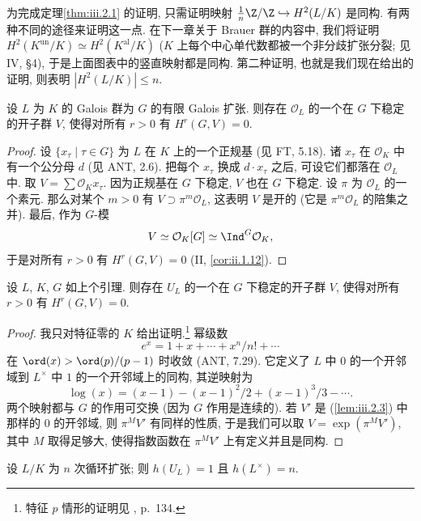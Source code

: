 为完成定理\ref{thm:iii.2.1} 的证明, 只需证明映射 $\tfrac{1}{n}\Z/\Z\hookrightarrow H^2(L/K)$ 是同构. 有两种不同的途径来证明这一点. 在下一章关于 Brauer 群的内容中, 我们将证明 $H^2(K^{\mathrm{un}}/K)\simeq H^2(K^{\mathrm{al}}/K)$ ($K$ 上每个中心单代数都被一个非分歧扩张分裂; 见 IV, \S 4), 于是上面图表中的竖直映射都是同构. 第二种证明, 也就是我们现在给出的证明, 则表明 $|H^2(L/K)|\le n$.

\begin{lemma}\label{lem:iii.2.3}
设 $L$ 为 $K$ 的 Galois 群为 $G$ 的有限 Galois 扩张. 则存在 $\mathcal{O}_L$ 的一个在 $G$ 下稳定的开子群 $V$, 使得对所有 $r>0$ 有 $H^r(G,V)=0$.
\end{lemma}

\begin{proof}
设 $\{x_\tau\mid\tau\in G\}$ 为 $L$ 在 $K$ 上的一个正规基 (见 FT, 5.18). 诸 $x_\tau$ 在 $\mathcal{O}_K$ 中有一个公分母 $d$ (见 ANT, 2.6). 把每个 $x_\tau$ 换成 $d\cdot x_\tau$ 之后, 可设它们都落在 $\mathcal{O}_L$ 中. 取 $V=\sum\mathcal{O}_K x_\tau$. 因为正规基在 $G$ 下稳定, $V$ 也在 $G$ 下稳定. 设 $\pi$ 为 $\mathcal{O}_L$ 的一个素元. 那么对某个 $m>0$ 有 $V\supset\pi^m\mathcal{O}_L$, 这表明 $V$ 是开的 (它是 $\pi^m\mathcal{O}_L$ 的陪集之并). 最后, 作为 $G$-模
\[
 V\simeq\mathcal{O}_K[G]\simeq\Ind^G\mathcal{O}_K,
\]
于是对所有 $r>0$ 有 $H^r(G,V)=0$ (II, \ref{cor:ii.1.12}).
\end{proof}

\begin{lemma}\label{lem:iii.2.4}
设 $L$, $K$, $G$ 如上个引理. 则存在 $U_L$ 的一个在 $G$ 下稳定的开子群 $V$, 使得对所有 $r>0$ 有 $H^r(G,V)=0$.
\end{lemma}

\begin{proof}
我只对特征零的 $K$ 给出证明.\footnote{特征 $p$ 情形的证明见 \cite{Serre1967b}, p.~134.} 幂级数
\[
 e^x=1+x+\cdots+x^n/n!+\cdots
\]
在 $\ord(x)>\ord(p)/(p-1)$ 时收敛 (ANT, 7.29). 它定义了 $L$ 中 $0$ 的一个开邻域到 $L^\times$ 中 $1$ 的一个开邻域上的同构, 其逆映射为
\[
 \log(x)=(x-1)-(x-1)^2/2+(x-1)^3/3-\cdots.
\]
两个映射都与 $G$ 的作用可交换 (因为 $G$ 作用是连续的). 若 $V'$ 是 (\ref{lem:iii.2.3}) 中那样的 $0$ 的开邻域, 则 $\pi^M V'$ 有同样的性质, 于是我们可以取 $V=\exp(\pi^M V')$, 其中 $M$ 取得足够大, 使得指数函数在 $\pi^M V'$ 上有定义并且是同构.
\end{proof}

\begin{lemma}\label{lem:iii.2.5}
设 $L/K$ 为 $n$ 次循环扩张; 则 $h(U_L)=1$ 且 $h(L^\times)=n$.
\end{lemma}

